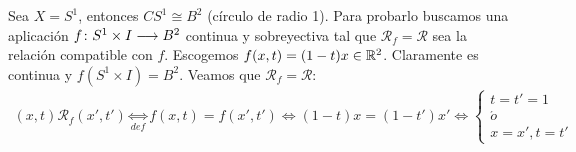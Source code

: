\documentclass[GTS.tex]{subfiles}
\begin{document}
\begin{ej} Sea $X=S^1$, entonces $CS^1\cong B^2$ (círculo de radio 1). Para probarlo buscamos una aplicación $f\colon{S^1\times I}\longrightarrow{B^2}$ continua y sobreyectiva tal que $\mathcal{R}_f=\mathcal{R}$ sea la relación compatible con $f$. Escogemos $f(x,t)=(1-t)x\in\mathbb{R}^2$. Claramente es continua y $f(S^1\times I)=B^2$. Veamos que $\mathcal{R}_f=\mathcal{R}$:
\begin{gather*}
(x,t)\mathcal{R}_f(x',t')\underset{def}{\Leftrightarrow}f(x,t)=f(x',t')\Leftrightarrow (1-t)x=(1-t')x'\Leftrightarrow\left\{\begin{array}{c}
t=t'=1 \\
\acute{o}\\
x=x', t=t'
\end{array}\right.
\end{gather*}
\end{ej}
\end{document}
